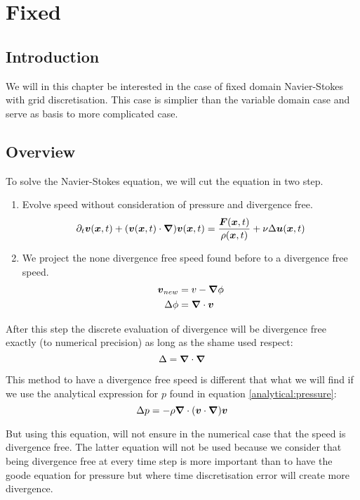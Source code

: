\chapter{Fixed}
\section{Introduction}

We will in this chapter be interested in the case of fixed domain Navier-Stokes with grid discretisation.
This case is simplier than the variable domain case and serve as basis to more complicated case.

\section{Overview}

To solve the Navier-Stokes equation, we will cut the equation in two step.
\begin{enumerate}
 \item Evolve speed without consideration of pressure and divergence free.
  \begin{equation}
   \partial_t {\boldsymbol {v}}({\boldsymbol {x}} ,t)+({\boldsymbol {v}}({\boldsymbol {x}},t)\cdot{\boldsymbol {\nabla}} ) {\boldsymbol {v}}({\boldsymbol {x}} ,t)=\frac{{\boldsymbol {F}}({\boldsymbol {x}},t)}{\rho({\boldsymbol {x}},t)}+\nu \Delta {\boldsymbol {u}}({\boldsymbol {x}},t)
  \end{equation}
 \item We project the none divergence free speed found before to a divergence free speed.
  \begin{align}
   {\boldsymbol {v}}_{new}&=v-{\boldsymbol {\nabla}}\phi\\
   \Delta \phi&={\boldsymbol {\nabla}} \cdot {\boldsymbol {v}}
  \end{align}
\end{enumerate}

After this step the discrete evaluation of divergence will be divergence free exactly (to numerical precision) as long as the shame used respect:
\begin{equation}
 \Delta={\boldsymbol {\nabla}}\cdot {\boldsymbol {\nabla}}
\end{equation}

\begin{rem}
 This method to have a divergence free speed is different that what we will find if we use the analytical expression for $p$ found in equation \ref{analytical:pressure}:
 \begin{equation}
  \Delta p=-\rho {\boldsymbol {\nabla}} \cdot ({\boldsymbol {v}}\cdot {\boldsymbol {\nabla}}) {\boldsymbol {v}}
 \end{equation}
 
 But using this equation, will not ensure in the numerical case that the speed is divergence free.
 The latter equation will not be used because we consider that being divergence free at every time step is more important than
 to have the goode equation for pressure but where time discretisation error will create more divergence.
\end{rem}

